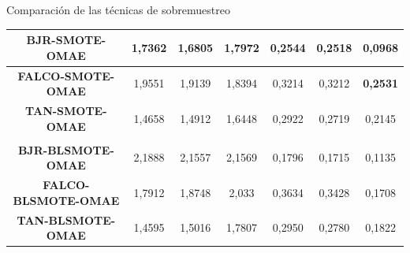 \documentclass{beamer}
\begin{document}
\begin{frame}{Comparación de las técnicas de sobremuestreo}
\begin{table}[H]
{\begin{tabular}{ccccccc}
	\multicolumn{1}{|c|}{\textbf{BJR-SMOTE-OMAE}}     & \multicolumn{1}{c|}{1,7362}  & \multicolumn{1}{c|}{1,6805}    & \multicolumn{1}{c|}{1,7972}          & \multicolumn{1}{c|}{0,2544}  & \multicolumn{1}{c|}{0,2518}     & \multicolumn{1}{c|}{0,0968}          \\ \hline
	\multicolumn{1}{|c|}{\textbf{FALCO-SMOTE-OMAE}}   & \multicolumn{1}{c|}{1,9551}  & \multicolumn{1}{c|}{1,9139}    & \multicolumn{1}{c|}{1,8394}          & \multicolumn{1}{c|}{0,3214}   & \multicolumn{1}{c|}{0,3212}    & \multicolumn{1}{c|}{\textbf{0,2531}} \\ \hline
	\multicolumn{1}{|c|}{\textbf{TAN-SMOTE-OMAE}}     & \multicolumn{1}{c|}{1,4658}  & \multicolumn{1}{c|}{1,4912}    & \multicolumn{1}{c|}{1,6448}          & \multicolumn{1}{c|}{0,2922}  & \multicolumn{1}{c|}{0,2719}    & \multicolumn{1}{c|}{0,2145}          \\ \hline
	                                                  &                               &                                 &                                       &                               &                                 &                                       \\ \hline
	\multicolumn{1}{|c|}{\textbf{BJR-BLSMOTE-OMAE}}   & \multicolumn{1}{c|}{2,1888}  & \multicolumn{1}{c|}{2,1557}    & \multicolumn{1}{c|}{2,1569}          & \multicolumn{1}{c|}{0,1796}   & \multicolumn{1}{c|}{0,1715}    & \multicolumn{1}{c|}{0,1135}          \\ \hline
	\multicolumn{1}{|c|}{\textbf{FALCO-BLSMOTE-OMAE}} & \multicolumn{1}{c|}{1,7912}  & \multicolumn{1}{c|}{1,8748}    & \multicolumn{1}{c|}{2,033}            & \multicolumn{1}{c|}{0,3634}  & \multicolumn{1}{c|}{0,3428}     & \multicolumn{1}{c|}{0,1708}          \\ \hline
	\multicolumn{1}{|c|}{\textbf{TAN-BLSMOTE-OMAE}}   & \multicolumn{1}{c|}{1,4595}  & \multicolumn{1}{c|}{1,5016}    & \multicolumn{1}{c|}{1,7807}          & \multicolumn{1}{c|}{0,2950}  & \multicolumn{1}{c|}{0,2780}    & \multicolumn{1}{c|}{0,1822}          \\ \hline
	\end{tabular}%
	}
	\end{table}

\end{frame}
\end{document}
